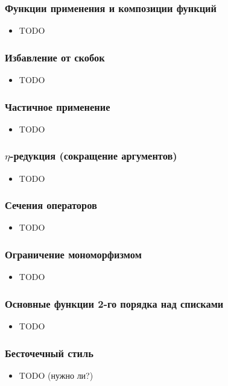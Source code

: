 \documentclass[10pt]{beamer}
\begin{document}
\begin{frame}[fragile]
\frametitle{Функции применения и композиции функций}
\begin{itemize}
    \item TODO
\end{itemize}
\end{frame}

\begin{frame}[fragile]
\frametitle{Избавление от скобок}
\begin{itemize}
    \item TODO
\end{itemize}
\end{frame}

\begin{frame}[fragile]
\frametitle{Частичное применение}
\begin{itemize}
    \item TODO
\end{itemize}
\end{frame}

\begin{frame}[fragile]
\frametitle{$\eta$-редукция (сокращение аргументов)}
\begin{itemize}
    \item TODO
\end{itemize}
\end{frame}

\begin{frame}[fragile]
\frametitle{Сечения операторов}
\begin{itemize}
    \item TODO
\end{itemize}
\end{frame}

\begin{frame}[fragile]
\frametitle{Ограничение мономорфизмом}
\begin{itemize}
    \item TODO
\end{itemize}
\end{frame}

\begin{frame}[fragile]
\frametitle{Основные функции 2-го порядка над списками}
\begin{itemize}
    \item TODO
\end{itemize}
\end{frame}

\begin{frame}[fragile]
\frametitle{Бесточечный стиль}
\begin{itemize}
    \item TODO (нужно ли?)
\end{itemize}
\end{frame}
\end{document}
